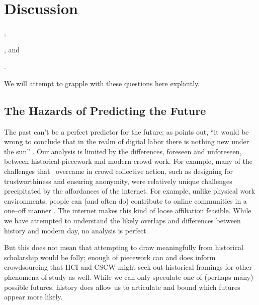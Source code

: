 \documentclass[trackingWork]{subfiles}
\begin{document}
\section{Discussion}
\begin{inlinelist}
  \item {},
  \item {}, and
  \item {}.
\end{inlinelist}
We will attempt to grapple with these questions here explicitly.


\subsection{The Hazards of Predicting the Future}\label{sec:perilousProblemsPredicting}
The past can't be a perfect predictor for the future;
as \citeauthor{scholz2012digital} points out,
``it would be wrong to conclude that
in the realm of digital labor
there is nothing new under the sun''
\cite{scholz2012digital}.
Our analysis is limited by the differences, foreseen and unforeseen, between historical piecework and modern crowd work.
For example, many of the challenges that \DO~overcame in crowd collective action, such as designing for trustworthiness and ensuring anonymity, were relatively unique challenges precipitated by the affordances of the internet.
For example, unlike physical work environments, people can (and often do) contribute to online communities in a one--off manner
\cite{mcinnis2016one}.
The internet makes this kind of loose affiliation feasible.
While we have attempted to understand the likely overlaps and differences between history and modern day, no analysis is perfect.


But this does not mean that
attempting to draw meaningfully from historical scholarship would be folly;
enough of piecework can and does inform crowdsourcing that
HCI and CSCW might seek out historical framings for other phenomena of study as well.
While we can only speculate one of (perhaps many) possible futures, history does allow us to articulate and bound which futures appear more likely.
\end{document}
